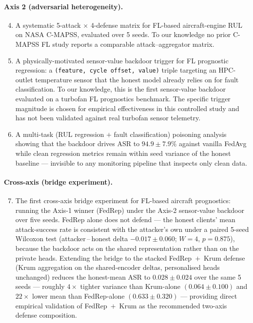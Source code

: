 \documentclass[preprint,12pt,authoryear]{elsarticle}
\begin{document}
\paragraph{Axis 2 (adversarial heterogeneity).}
\begin{enumerate}
    \setcounter{enumi}{3}
    \item A systematic 5-attack $\times$ 4-defense matrix for
    FL-based aircraft-engine RUL on NASA C-MAPSS, evaluated over
    5 seeds. To our knowledge no prior C-MAPSS FL study reports a
    comparable attack--aggregator matrix.

    \item A physically-motivated sensor-value backdoor trigger for
    FL prognostic regression: a \texttt{(feature, cycle offset,
    value)} triple targeting an HPC-outlet temperature sensor that
    the honest model already relies on for fault classification.
    To our knowledge, this is the first sensor-value backdoor
    evaluated on a turbofan FL prognostics benchmark. The specific
    trigger magnitude is chosen for empirical effectiveness in this
    controlled study and has not been validated against real
    turbofan sensor telemetry.

    \item A multi-task (RUL regression $+$ fault classification)
    poisoning analysis showing that the backdoor drives ASR to
    $94.9 \pm 7.9\%$ against vanilla FedAvg while clean regression
    metrics remain within seed variance of the honest baseline
    --- invisible to any monitoring pipeline that inspects only
    clean data.
\end{enumerate}

\paragraph{Cross-axis (bridge experiment).}
\begin{enumerate}
    \setcounter{enumi}{6}
    \item The first cross-axis bridge experiment for FL-based
    aircraft prognostics: running the Axis-1 winner (FedRep) under
    the Axis-2 sensor-value backdoor over five seeds. FedRep alone
    does not defend --- the honest clients' mean attack-success
    rate is consistent with the attacker's own under a paired
    5-seed Wilcoxon test (attacker\,--\,honest delta
    $-0.017 \pm 0.060$; $W = 4$, $p = 0.875$), because the backdoor
    acts on the shared representation rather than on the private
    heads. Extending the bridge to the stacked
    FedRep~$+$~Krum defense (Krum aggregation on the shared-encoder
    deltas, personalised heads unchanged) reduces the honest-mean
    ASR to $0.028 \pm 0.024$ over the same 5 seeds --- roughly
    $4\times$ tighter variance than Krum-alone $(0.064 \pm 0.100)$
    and $22\times$ lower mean than FedRep-alone $(0.633 \pm 0.320)$
    --- providing direct empirical validation of FedRep~$+$~Krum as
    the recommended two-axis defense composition.
\end{enumerate}
\end{document}
